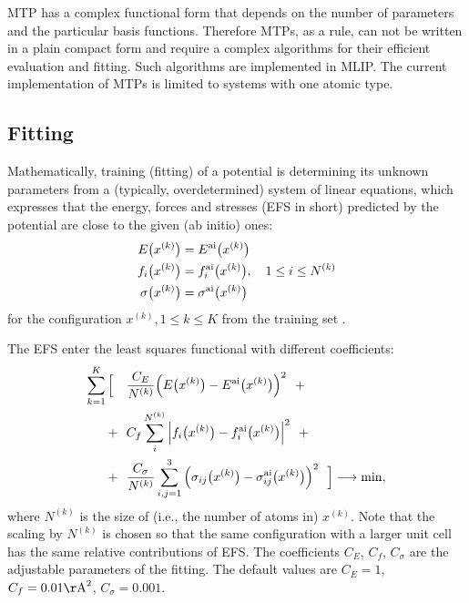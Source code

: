 \documentclass[12pt]{article}
\newcommand{\ai}{{\rm ai}}
\renewcommand{\_}{\char`_}
\begin{document}
MTP has a complex functional form that depends on the number of parameters and the particular basis functions.
Therefore MTPs, as a rule, can not be written in a plain compact form and require a complex algorithms for their efficient evaluation and fitting.
Such algorithms are implemented in MLIP.
The current implementation of MTPs is limited to systems with one atomic type.

\subsection{Fitting}

Mathematically, training (fitting) of a potential is determining its unknown parameters from a (typically, overdetermined) system of linear equations, which expresses that the energy, forces and stresses (EFS in short) predicted by the potential are close to the given (ab initio) ones:
\begin{align*}
E\big(x^{(k)}\big) &= E^\ai\big(x^{(k)}\big)
\\
f_i\big(x^{(k)}\big) &= f_i^\ai\big(x^{(k)}\big), \quad {1\leq i\leq N^{(k)}}
\\
\sigma\big(x^{(k)}\big) &= \sigma^\ai\big(x^{(k)}\big)
\end{align*}
for the configuration $x^{(k)}, {1\leq k \leq K}$ from the training set \cite{Shapeev2016-MTP, ActiveLearning}.

The EFS enter the least squares functional with different coefficients:
\begin{equation}
\label{eq:fit}
\begin{split}
\sum_{k=1}^K\Big[~~~&\frac{C_E}{N^{(k)}} \Big(E\big(x^{(k)}\big)-E^\ai\big(x^{(k)}\big)\Big)^2 ~~+\\
+~~&C_f \sum_i^{N^{(k)}} \Big|f_i\big(x^{(k)}\big)-f_i^\ai\big(x^{(k)}\big)\Big|^2 ~~+ \\
+~~&\frac{C_\sigma}{N^{(k)}} \sum_{i,j=1}^3  \Big(\sigma_{ij}\big(x^{(k)}\big)-\sigma^\ai_{ij}\big(x^{(k)}\big)\Big)^2 ~~ \Big] \longrightarrow \min,\\
\end{split}
\end{equation}
where $N^{(k)}$ is the size of (i.e., the number of atoms in) $x^{(k)}$.
Note that the scaling by $N^{(k)}$ is chosen so that the same configuration with a larger unit cell has the same relative contributions of EFS.
The coefficients $C_E$, $C_f$, $C_\sigma$ are the adjustable parameters of the fitting.
The default values are $C_E = 1$, $C_f = 0.01 {\rm \AA}^2$, $C_\sigma = 0.001$.
\end{document}
